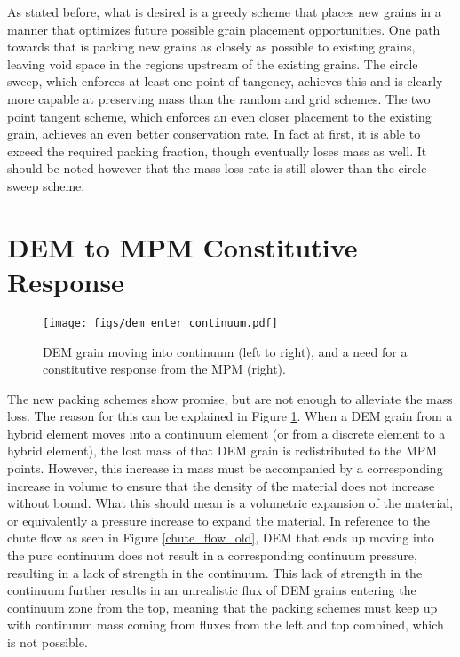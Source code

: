 As stated before, what is desired is a greedy scheme that places new grains in a manner that optimizes future possible grain placement opportunities. One path towards that is packing new grains as closely as possible to existing grains, leaving void space in the regions upstream of the existing grains. The circle sweep, which enforces at least one point of tangency, achieves this and is clearly more capable at preserving mass than the random and grid schemes. The two point tangent scheme, which enforces an even closer placement to the existing grain, achieves an even better conservation rate. In fact at first, it is able to exceed the required packing fraction, though eventually loses mass as well. It should be noted however that the mass loss rate is still slower than the circle sweep scheme.

\section{DEM to MPM Constitutive Response}
\begin{figure}[htp] 
    \centering
    \texttt{[image: figs/dem\_enter\_continuum.pdf]}
    \caption{DEM grain moving into continuum (left to right), and a need for a constitutive response from the MPM (right).}
    \label{lack_of_response}
\end{figure}

The new packing schemes show promise, but are not enough to alleviate the mass loss. The reason for this can be explained in Figure \ref{lack_of_response}. When a DEM grain from a hybrid element moves into a continuum element (or from a discrete element to a hybrid element), the lost mass of that DEM grain is redistributed to the MPM points. However, this increase in mass must be accompanied by a corresponding increase in volume to ensure that the density of the material does not increase without bound. What this should mean is a volumetric expansion of the material, or equivalently a pressure increase to expand the material. In reference to the chute flow as seen in Figure \ref{chute_flow_old}, DEM that ends up moving into the pure continuum does not result in a corresponding continuum pressure, resulting in a lack of strength in the continuum. This lack of strength in the continuum further results in an unrealistic flux of DEM grains entering the continuum zone from the top, meaning that the packing schemes must keep up with continuum mass coming from fluxes from the left and top combined, which is not possible.


